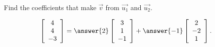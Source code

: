 \documentclass{ximera}
\author{Zack Reed}
\begin{document}
\begin{exercise}
  Find the coefficients that make $\vec{v}$ from $\vec{u_1}$ and $\vec{u_2}$.
  
  \begin{equation*}
    \startmat{c}
      4 \\
      4 \\
      -3
    \stopmat
    =
    \answer{2}
    \startmat{c}
      3 \\
      1 \\
      -1
    \stopmat
    + \answer{-1}
    \startmat{c}
      2 \\
      -2 \\
      1
    \stopmat.
  \end{equation*}
  
\end{exercise}
\end{document}
